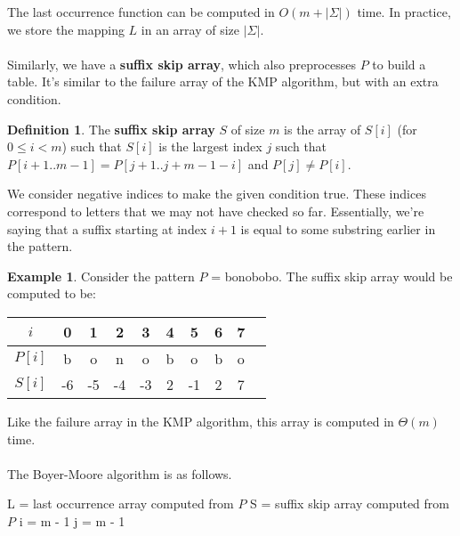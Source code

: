 \documentclass[]{article}
\theoremstyle{definition}
\newtheorem*{defn}{Definition}
\newtheorem{ex}{Example}[section]
\begin{document}
				The last occurrence function can be computed in $O(m + |\Sigma|)$ time. In practice, we store the mapping $L$ in an array of size $|\Sigma|$.
				\\ \\
				Similarly, we have a \textbf{suffix skip array}, which also preprocesses $P$ to build a table. It's similar to the failure array of the KMP algorithm, but with an extra condition.
				\begin{defn}
					The \textbf{suffix skip array} $S$ of size $m$ is the array of $S[i]$ (for $0 \le i < m$) such that $S[i]$ is the largest index $j$ such that $P[i + 1..m - 1] = P[j + 1..j+ m - 1 - i]$ and $P[j] \ne P[i]$.
				\end{defn}

				We consider negative indices to make the given condition true. These indices correspond to letters that we may not have checked so far. Essentially, we're saying that a suffix starting at index $i + 1$ is equal to some substring earlier in the pattern.

				\begin{ex}
					Consider the pattern $P$ = bonobobo. The suffix skip array would be computed to be:
					\begin{center}
						\begin{tabular}{|c||c|c|c|c|c|c|c|c|c|}
							\hline 
							$i$ & 0 & 1 & 2 & 3 & 4 & 5 & 6 & 7 \\ \hline
							$P[i]$ & b & o & n & o & b & o & b & o \\
							$S[i]$ & -6 & -5 & -4 & -3 & 2 & -1 & 2 & 7 \\ \hline
						\end{tabular}
					\end{center}
				\end{ex}

				Like the failure array in the KMP algorithm, this array is computed in $\Theta(m)$ time.
				\\ \\
				The Boyer-Moore algorithm is as follows. \\
				\begin{algorithm}[H]
					L = last occurrence array computed from $P$\;
					S = suffix skip array computed from $P$\;
					i = m - 1\;
					j = m - 1\;
				\end{algorithm}
\end{document}
